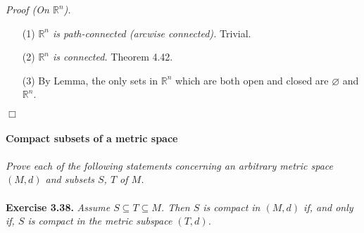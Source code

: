 \documentclass{article}
\begin{document}
\emph{Proof (On $\mathbb{R}^n$).}
\begin{enumerate}
\item[(1)]
\emph{$\mathbb{R}^n$ is path-connected (arcwise connected).}
Trivial.
\item[(2)]
\emph{$\mathbb{R}^n$ is connected.}
Theorem 4.42.
\item[(3)]
By Lemma, the only sets in $\mathbb{R}^n$ which are both open and closed
are $\varnothing$ and $\mathbb{R}^n$.
\end{enumerate}
$\Box$ \\\\






\textbf{\large Compact subsets of a metric space} \\\\

\emph{Prove each of the following statements concerning an arbitrary metric space
$(M,d)$ and subsets $S$, $T$ of $M$.} \\\\



\textbf{Exercise 3.38.}
\emph{Assume $S \subseteq T \subseteq M$.
Then $S$ is compact in $(M,d)$ if, and only if,
$S$ is compact in the metric subspace $(T,d)$. } \\
\end{document}
